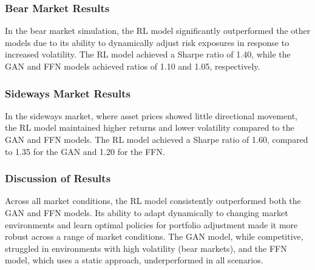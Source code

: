 \subsubsection*{Bear Market Results}

In the bear market simulation, the RL model significantly outperformed the other models due to its ability to dynamically adjust risk exposures in response to increased volatility. The RL model achieved a Sharpe ratio of 1.40, while the GAN and FFN models achieved ratios of 1.10 and 1.05, respectively.

\subsubsection*{Sideways Market Results}

In the sideways market, where asset prices showed little directional movement, the RL model maintained higher returns and lower volatility compared to the GAN and FFN models. The RL model achieved a Sharpe ratio of 1.60, compared to 1.35 for the GAN and 1.20 for the FFN.

\subsubsection*{Discussion of Results}

Across all market conditions, the RL model consistently outperformed both the GAN and FFN models. Its ability to adapt dynamically to changing market environments and learn optimal policies for portfolio adjustment made it more robust across a range of market conditions. The GAN model, while competitive, struggled in environments with high volatility (bear markets), and the FFN model, which uses a static approach, underperformed in all scenarios.

\newpage
